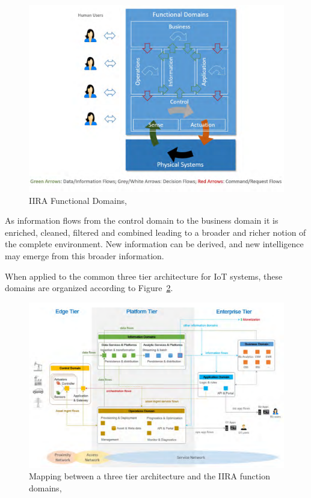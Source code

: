 \begin{figure}[H]
    \centering
    \includegraphics[scale=0.5]{
        assets/figures/irra-domains.png
    }
    \caption[\gls{IIRA} Functional Domains]{\gls{IIRA} Functional Domains, \cite{iira}}
    \label{fig:stateofart:arch:iira:domains}
\end{figure}

As information flows from the control domain to the business domain it is enriched, cleaned, filtered and combined leading to a broader and richer notion of the complete environment. New information can be derived, and new intelligence may emerge from this broader information.

When applied to the common three tier architecture for IoT systems, these domains are organized according to Figure~\ref{fig:stateofart:arch:iira:applied}.

\begin{figure}[H]
    \centering
    \includegraphics[scale=0.5]{
        assets/figures/irra-applied.png
    }
    \caption[Mapping between a three tier architecture and the \gls{IIRA} function domains]{Mapping between a three tier architecture and the \gls{IIRA} function domains, \cite{iira}}
    \label{fig:stateofart:arch:iira:applied}
\end{figure}

